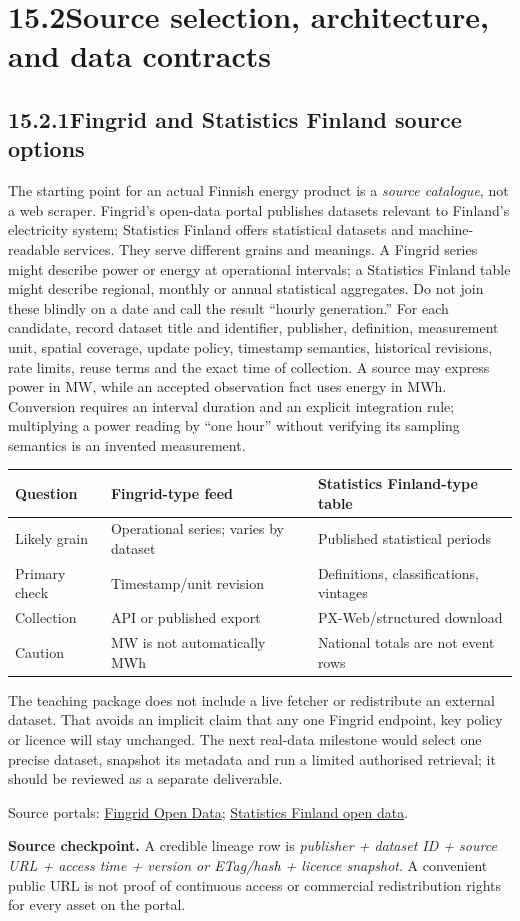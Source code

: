 \documentclass[11pt,twoside]{article}
\newcommand{\topic}[2]{\subsection*{#1\quad #2}}
\begin{document}
\section*{15.2\quad Source selection, architecture, and data contracts}
\topic{15.2.1}{Fingrid and Statistics Finland source options}
The starting point for an actual Finnish energy product is a \emph{source catalogue}, not a web scraper. Fingrid's open-data portal publishes datasets relevant to Finland's electricity system; Statistics Finland offers statistical datasets and machine-readable services. They serve different grains and meanings. A Fingrid series might describe power or energy at operational intervals; a Statistics Finland table might describe regional, monthly or annual statistical aggregates. Do not join these blindly on a date and call the result ``hourly generation.''
For each candidate, record dataset title and identifier, publisher, definition, measurement unit, spatial coverage, update policy, timestamp semantics, historical revisions, rate limits, reuse terms and the exact time of collection. A source may express power in MW, while an accepted observation fact uses energy in MWh. Conversion requires an interval duration and an explicit integration rule; multiplying a power reading by ``one hour'' without verifying its sampling semantics is an invented measurement.
\begin{center}\small\begin{tabularx}{\linewidth}{@{}p{28mm}X X@{}}\toprule
Question & Fingrid-type feed & Statistics Finland-type table\\\midrule
Likely grain & Operational series; varies by dataset & Published statistical periods\\
Primary check & Timestamp/unit revision & Definitions, classifications, vintages\\
Collection & API or published export & PX-Web/structured download\\
Caution & MW is not automatically MWh & National totals are not event rows\\\bottomrule\end{tabularx}\end{center}
The teaching package does not include a live fetcher or redistribute an external dataset. That avoids an implicit claim that any one Fingrid endpoint, key policy or licence will stay unchanged. The next real-data milestone would select one precise dataset, snapshot its metadata and run a limited authorised retrieval; it should be reviewed as a separate deliverable.\par\begingroup\fontsize{8}{9.5}\selectfont\color{inkgray}Source portals: \href{https://data.fingrid.fi/en/}{Fingrid Open Data}; \href{https://stat.fi/en/services/statistical-data-services/open-data-and-interfaces}{Statistics Finland open data}.\par\endgroup
\begin{insight}\textbf{Source checkpoint.} A credible lineage row is \emph{publisher + dataset ID + source URL + access time + version or ETag/hash + licence snapshot}. A convenient public URL is not proof of continuous access or commercial redistribution rights for every asset on the portal.\end{insight}
\end{document}
